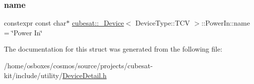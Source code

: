 \subsubsection{\texorpdfstring{name}{name}}
{\footnotesize\ttfamily constexpr const char$\ast$ \hyperlink{structcubesat_1_1__Device}{cubesat\+::\+\_\+\+Device}$<$ Device\+Type\+::\+T\+CV $>$\+::Power\+In\+::name = \char`\"{}Power In\char`\"{}\hspace{0.3cm}{\ttfamily [static]}}



The documentation for this struct was generated from the following file\+:\begin{DoxyCompactItemize}
\item 
/home/osboxes/cosmos/source/projects/cubesat-\/kit/include/utility/\hyperlink{DeviceDetail_8h}{Device\+Detail.\+h}\end{DoxyCompactItemize}
